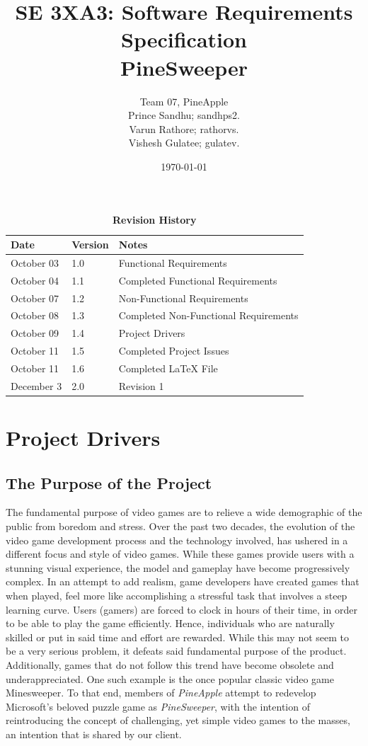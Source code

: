 \documentclass[12pt, titlepage]{article}
\title{SE 3XA3: Software Requirements Specification\\PineSweeper}
\author{Team 07, PineApple
		\\ Prince Sandhu; sandhps2.
		\\ Varun Rathore; rathorvs.
		\\ Vishesh Gulatee; gulatev.
}
\date{\today}
\begin{document}
\maketitle
{}
\tableofcontents
{}
\listoftables
\listoffigures
\setlength{\parindent}{0pt}
\begin{table}[bp]
\caption{\bf Revision History}
\begin{tabularx}{\textwidth}{p{3cm}p{2cm}X}
\toprule {\bf Date} & {\bf Version} & {\bf Notes}\\
\midrule
October 03 & 1.0 & Functional Requirements\\
October 04 & 1.1 & Completed Functional Requirements\\
October 07 & 1.2 &  Non-Functional Requirements\\
October 08 & 1.3 & Completed Non-Functional Requirements\\
October 09 & 1.4 & Project Drivers\\
October 11 & 1.5 & Completed Project Issues\\
October 11 & 1.6 & Completed LaTeX File\\
December 3 & 2.0 & Revision 1 \\

\bottomrule
\end{tabularx}
\end{table}
\newpage
{}

\section{Project Drivers}

\subsection{The Purpose of the Project}
The fundamental purpose of video games are to relieve a wide demographic of the public from boredom and stress. Over the past two
decades, the evolution of the video game development process and the technology involved, has ushered in a different focus and style
of video games. While these games provide users with a stunning visual experience, the model and gameplay have become
progressively complex. In an attempt to add realism, game developers have created games that when played, feel more like
accomplishing a stressful task that involves a steep learning curve. Users (gamers) are forced to clock in hours of their time, in order to
be able to play the game efficiently. Hence, individuals who are naturally skilled or put in said time and effort are rewarded. While this
may not seem to be a very serious problem, it defeats said fundamental purpose of the product. Additionally, games that do not follow
this trend have become obsolete and underappreciated. One such example is the once popular classic video game Minesweeper. To
that end, members of \textit{PineApple} attempt to redevelop Microsoft's beloved puzzle game as \textit{PineSweeper}, with the intention
of reintroducing the concept of challenging, yet simple video games to the masses, an intention that is shared by our client.
\end{document}
